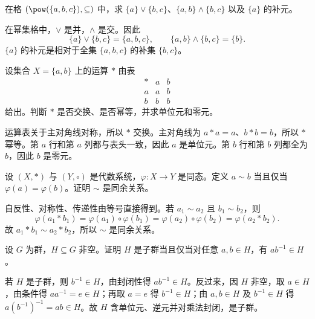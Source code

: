 \begin{exercise}[level=basic]
在格 $(\pow(\{a,b,c\}),\subseteq)$ 中，求 $\{a\}\vee\{b,c\}$、$\{a,b\}\wedge\{b,c\}$ 以及 $\{a\}$ 的补元。
\begin{solution}
在幂集格中，$\vee$ 是并，$\wedge$ 是交。因此
  \[
  \{a\}\vee\{b,c\}=\{a,b,c\},\qquad
  \{a,b\}\wedge\{b,c\}=\{b\}.
  \]
  $\{a\}$ 的补元是相对于全集 $\{a,b,c\}$ 的补集 $\{b,c\}$。
\end{solution}
\end{exercise}

\begin{exercise}[level=standard]
设集合 $X=\{a,b\}$ 上的运算 $*$ 由表
  \[
  \begin{array}{c|cc}
  *&a&b\\ \hline
  a&a&b\\
  b&b&b
  \end{array}
  \]
  给出。判断 $*$ 是否交换、是否幂等，并求单位元和零元。
\begin{solution}
运算表关于主对角线对称，所以 $*$ 交换。主对角线为 $a*a=a$、$b*b=b$，所以 $*$ 幂等。第 $a$ 行和第 $a$ 列都与表头一致，因此 $a$ 是单位元。第 $b$ 行和第 $b$ 列都全为 $b$，因此 $b$ 是零元。
\end{solution}
\end{exercise}

\begin{exercise}[level=standard]
设 $(X,*)$ 与 $(Y,\circ)$ 是代数系统，$\varphi:X\to Y$ 是同态。定义 $a\sim b$ 当且仅当 $\varphi(a)=\varphi(b)$。证明 $\sim$ 是同余关系。
\begin{solution}
自反性、对称性、传递性由等号直接得到。若 $a_1\sim a_2$ 且 $b_1\sim b_2$，则
  \[
  \varphi(a_1*b_1)=\varphi(a_1)\circ\varphi(b_1)
  =\varphi(a_2)\circ\varphi(b_2)
  =\varphi(a_2*b_2).
  \]
  故 $a_1*b_1\sim a_2*b_2$，所以 $\sim$ 是同余关系。
\end{solution}
\end{exercise}

\begin{exercise}[level=standard]
设 $G$ 为群，$H\subseteq G$ 非空。证明 $H$ 是子群当且仅当对任意 $a,b\in H$，有 $ab^{-1}\in H$。
\begin{solution}
若 $H$ 是子群，则 $b^{-1}\in H$，由封闭性得 $ab^{-1}\in H$。反过来，因 $H$ 非空，取 $a\in H$，由条件得 $aa^{-1}=e\in H$；再取 $a=e$ 得 $b^{-1}\in H$；由 $a,b\in H$ 及 $b^{-1}\in H$ 得 $a(b^{-1})^{-1}=ab\in H$。故 $H$ 含单位元、逆元并对乘法封闭，是子群。
\end{solution}
\end{exercise}

